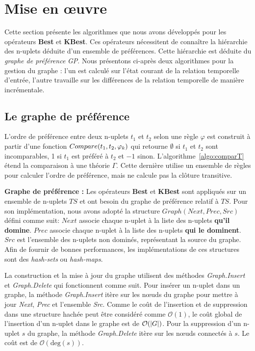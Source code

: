 \section{Mise en œuvre}\label{sec:ext:prefs:algo}
Cette section présente les algorithmes que nous avons développés pour les opérateurs \textbf{Best} et \textbf{KBest}. Ces opérateurs nécessitent de connaître la hiérarchie des n-uplets déduite d'un ensemble de préférences. Cette hiérarchie est déduite du \textit{graphe de préférence} \textit{GP}. Nous présentons ci-après deux algorithmes pour la gestion du graphe : l'un est calculé sur l'état courant de la relation temporelle d'entrée, l'autre travaille sur les différences de la relation temporelle de manière incrémentale.

\subsection{Le graphe de préférence}
L'ordre de préférence entre deux n-uplets $t_1$ et $t_2$ selon une règle $\varphi$ est construit à partir d'une fonction $Com\-pare(t_1,t_2,\varphi_k)$ qui retourne $\emptyset$ si $t_1$ et $t_2$ sont incomparables, 1 si $t_1$ est préféré à $t_2$ et $-1$ sinon. L'algorithme~\ref{algo:comparT} étend la comparaison à une théorie $\Gamma$. Cette dernière utilise un ensemble de règles pour calculer l'ordre de préférence, mais ne calcule pas la clôture transitive.

\textbf{Graphe de préférence : }
Les opérateurs \textbf{Best} et \textbf{KBest} sont appliqués sur un ensemble de n-uplets $TS$ et ont besoin du graphe de préférence relatif à $TS$.
Pour son implémentation, nous avons adopté la structure $Graph(Next, Prec, Src)$ défini comme suit:
 $Next$ associe chaque n-uplet à la liste des n-uplets \textbf{qu'il domine}.
 $Prec$ associe chaque n-uplet à la liste des n-uplets \textbf{qui le dominent}.
 $Src$ est l'ensemble des n-uplets non dominés, représentant la source du graphe.
Afin de fournir de bonnes performances, les implémentations de ces structures sont des \textit{hash-sets} ou \textit{hash-maps}.

La construction et la mise à jour du graphe utilisent des méthodes \textit{Graph.Insert} et \textit{Graph.Delete} qui fonctionnent comme suit. Pour insérer un n-uplet dans un graphe, la méthode \textit{Graph.Insert} itère sur les nœuds du graphe pour mettre à jour \textit{Next}, \textit{Prec} et l'ensemble \textit{Src}. Comme le coût de l'insertion et de suppression dans une structure hachée peut être considéré comme $\mathcal O(1)$, le coût global de l'insertion d'un n-uplet dans le graphe est de $\mathcal O(\left| G \right|)$. Pour la suppression d'un n-uplet $s$ du graphe, la méthode \textit{Graph.Delete} itère sur les nœuds connectés à $s$. Le coût est de $\mathcal O(\mathrm{deg}(s))$.


